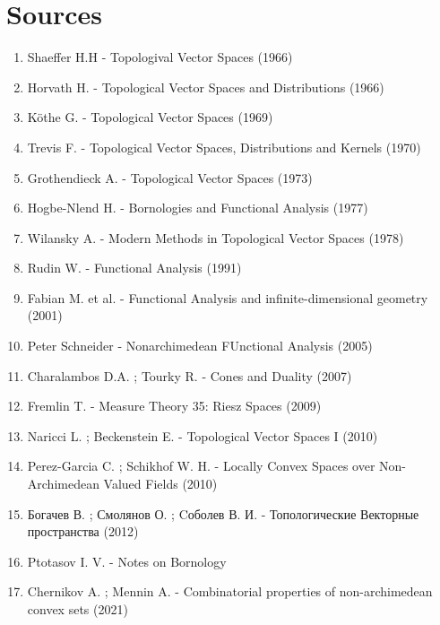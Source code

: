 \documentclass[12pt]{scrartcl}
\renewcommand{\.}{\; . \;}
\begin{document}
\section*{Sources}
\begin{enumerate}
\item Shaeffer H.H - Topologival Vector Spaces (1966)
\item Horvath H. - Topological Vector Spaces and Distributions (1966)
\item K\"othe G. - Topological Vector Spaces (1969)
\item Trevis F.  - Topological Vector Spaces, Distributions and Kernels (1970)
\item Grothendieck A. - Topological Vector Spaces (1973)
\item Hogbe-Nlend H.  - Bornologies and Functional Analysis (1977)
\item Wilansky A. - Modern Methods in Topological Vector Spaces (1978) 
\item Rudin W.  - Functional Analysis (1991) 
\item Fabian M. et al.   - Functional Analysis and infinite-dimensional geometry (2001)
\item Peter Schneider - Nonarchimedean FUnctional Analysis (2005)
\item Charalambos D.A. ; Tourky R. - Cones and Duality (2007)
\item Fremlin T. - Measure Theory 35: Riesz Spaces (2009)
\item Naricci L. ; Beckenstein E. - Topological Vector Spaces I (2010)
\item Perez-Garcia C. ; Schikhof W. H. - Locally Convex Spaces over Non-Archimedean Valued Fields (2010)
\item Богачев В. ; Смолянов О. ; Cоболев В. И. -  Топологические Векторные пространства (2012)
\item Ptotasov I. V. - Notes on Bornology
\item Chernikov A. ; Mennin A.  -  Combinatorial properties of non-archimedean convex sets  (2021)
\end{enumerate}
\end{document}
